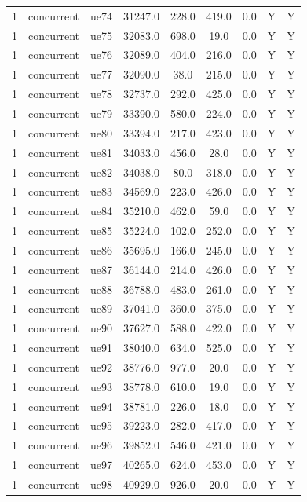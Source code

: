 \begin{table}[ht]
\begin{tabular}{|c|c|c|c|c|c|c|c|c|}
1 & concurrent & ue74 & 31247.0 & 228.0 & 419.0 & 0.0 & Y & Y \\
1 & concurrent & ue75 & 32083.0 & 698.0 & 19.0 & 0.0 & Y & Y \\
1 & concurrent & ue76 & 32089.0 & 404.0 & 216.0 & 0.0 & Y & Y \\
1 & concurrent & ue77 & 32090.0 & 38.0 & 215.0 & 0.0 & Y & Y \\
1 & concurrent & ue78 & 32737.0 & 292.0 & 425.0 & 0.0 & Y & Y \\
1 & concurrent & ue79 & 33390.0 & 580.0 & 224.0 & 0.0 & Y & Y \\
1 & concurrent & ue80 & 33394.0 & 217.0 & 423.0 & 0.0 & Y & Y \\
1 & concurrent & ue81 & 34033.0 & 456.0 & 28.0 & 0.0 & Y & Y \\
1 & concurrent & ue82 & 34038.0 & 80.0 & 318.0 & 0.0 & Y & Y \\
1 & concurrent & ue83 & 34569.0 & 223.0 & 426.0 & 0.0 & Y & Y \\
1 & concurrent & ue84 & 35210.0 & 462.0 & 59.0 & 0.0 & Y & Y \\
1 & concurrent & ue85 & 35224.0 & 102.0 & 252.0 & 0.0 & Y & Y \\
1 & concurrent & ue86 & 35695.0 & 166.0 & 245.0 & 0.0 & Y & Y \\
1 & concurrent & ue87 & 36144.0 & 214.0 & 426.0 & 0.0 & Y & Y \\
1 & concurrent & ue88 & 36788.0 & 483.0 & 261.0 & 0.0 & Y & Y \\
1 & concurrent & ue89 & 37041.0 & 360.0 & 375.0 & 0.0 & Y & Y \\
1 & concurrent & ue90 & 37627.0 & 588.0 & 422.0 & 0.0 & Y & Y \\
1 & concurrent & ue91 & 38040.0 & 634.0 & 525.0 & 0.0 & Y & Y \\
1 & concurrent & ue92 & 38776.0 & 977.0 & 20.0 & 0.0 & Y & Y \\
1 & concurrent & ue93 & 38778.0 & 610.0 & 19.0 & 0.0 & Y & Y \\
1 & concurrent & ue94 & 38781.0 & 226.0 & 18.0 & 0.0 & Y & Y \\
1 & concurrent & ue95 & 39223.0 & 282.0 & 417.0 & 0.0 & Y & Y \\
1 & concurrent & ue96 & 39852.0 & 546.0 & 421.0 & 0.0 & Y & Y \\
1 & concurrent & ue97 & 40265.0 & 624.0 & 453.0 & 0.0 & Y & Y \\
1 & concurrent & ue98 & 40929.0 & 926.0 & 20.0 & 0.0 & Y & Y \\

\end{tabular}
\end{table}
